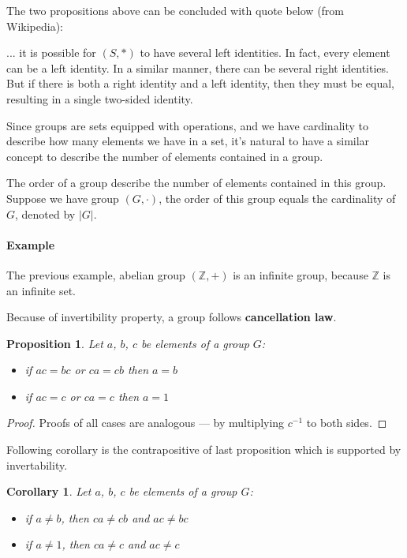 \documentclass[UTF8]{ctexart}
\theoremstyle{mystyle}
\newtheorem{proposition}{Proposition}[section]
\theoremstyle{myremark}
\theoremstyle{plain}
\newtheorem{corollary}{Corollary}[section]
\newcommand{\Z}{\mathbb Z}
\begin{document}
The two propositions above can be concluded with quote below (from Wikipedia):
\begin{displayquote}
    ... it is possible for $ (S, *) $ to have several left identities. In fact, every element can be a left identity. In a similar manner, there can be several right identities. But if there is both a right identity and a left identity, then they must be equal, resulting in a single two-sided identity. 
\end{displayquote}

Since groups are sets equipped with operations, and we have cardinality to describe how many elements we have in a set, it's natural to have a similar concept to describe the number of elements contained in a group.

\begin{definition}
    The order of a group describe the number of elements contained in this group. Suppose we have group $ (G, \cdot) $, the order of this group equals the cardinality of $ G $, denoted by $ |G| $.
\end{definition}

\paragraph{Example}
The previous example, abelian group $ (\Z, +) $ is an infinite group, because $ \Z $ is an infinite set.

Because of invertibility property, a group follows \textbf{cancellation law}.

\begin{proposition}{}
    Let $ a $, $ b $, $ c $ be elements of a group $ G $: 
    \begin{itemize}
        \item if $ ac = bc $ or $ ca = cb $ then $ a = b $
        \item if $ ac = c $ or $ ca = c $ then $ a = 1 $
    \end{itemize}
\end{proposition}

\begin{proof}
    Proofs of all cases are analogous --- by multiplying $ c^{-1} $ to both sides.
\end{proof}

Following corollary is the contrapositive of last proposition which is supported by invertability.

\begin{corollary}
    Let $ a $, $ b $, $ c $ be elements of a group $ G $: 
    \begin{itemize}
        \item if $ a \neq b $, then $ ca \neq cb $ and $ ac \neq bc $
        \item if $ a \neq 1 $, then $ ca \neq c $ and $ ac \neq c $
    \end{itemize}
\end{corollary}
\end{document}
